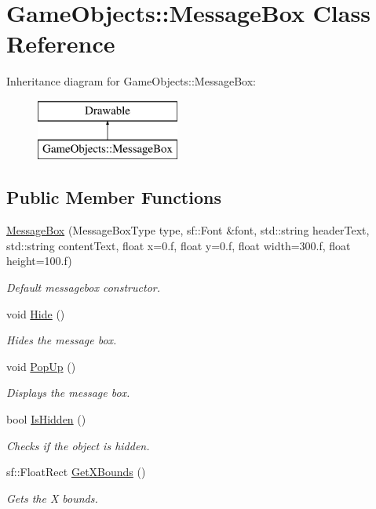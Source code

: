 \hypertarget{class_game_objects_1_1_message_box}{}\section{Game\+Objects\+::Message\+Box Class Reference}
\label{class_game_objects_1_1_message_box}
Inheritance diagram for Game\+Objects\+::Message\+Box\+:\begin{figure}[H]
\begin{center}
\leavevmode
\includegraphics[height=2.000000cm]{class_game_objects_1_1_message_box}
\end{center}
\end{figure}
\subsection*{Public Member Functions}
\begin{DoxyCompactItemize}
\item 
\mbox{\hyperlink{class_game_objects_1_1_message_box_af0c39632ec8ba0b07211da59bdabda7c}{Message\+Box}} (Message\+Box\+Type type, sf\+::\+Font \&font, std\+::string header\+Text, std\+::string content\+Text, float x=0.f, float y=0.f, float width=300.f, float height=100.f)
\begin{DoxyCompactList}\small\item\em Default messagebox constructor. \end{DoxyCompactList}\item 
void \mbox{\hyperlink{class_game_objects_1_1_message_box_abda08bef1372287caa376336ec62ee25}{Hide}} ()
\begin{DoxyCompactList}\small\item\em Hides the message box. \end{DoxyCompactList}\item 
void \mbox{\hyperlink{class_game_objects_1_1_message_box_a7433a3b35f9d64d274c2fbc8c0d6b379}{Pop\+Up}} ()
\begin{DoxyCompactList}\small\item\em Displays the message box. \end{DoxyCompactList}\item 
bool \mbox{\hyperlink{class_game_objects_1_1_message_box_a307b6074130607c6b1fff696315e8dc9}{Is\+Hidden}} ()
\begin{DoxyCompactList}\small\item\em Checks if the object is hidden. \end{DoxyCompactList}\item 
sf\+::\+Float\+Rect \mbox{\hyperlink{class_game_objects_1_1_message_box_a9632c2496557a8fd93c58c4af0df4e22}{Get\+X\+Bounds}} ()
\begin{DoxyCompactList}\small\item\em Gets the X bounds. \end{DoxyCompactList}\end{DoxyCompactItemize}


